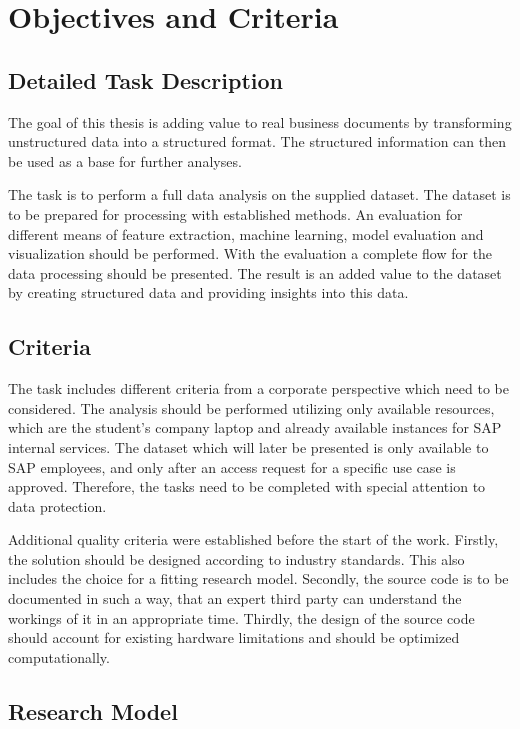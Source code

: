 \chapter{Objectives and Criteria}
\section{Detailed Task Description}
\label{section:detailed-task}
The goal of this thesis is adding value to real business documents by transforming unstructured data into a structured format. The structured information can then be used as a base for further analyses. 

The task is to perform a full data analysis on the supplied dataset. The dataset is to be prepared for processing with established methods. An evaluation for different means of feature extraction, machine learning, model evaluation and visualization should be performed. With the evaluation a complete flow for the data processing should be presented. The result is an added value to the dataset by creating structured data and providing insights into this data.

\section{Criteria}
\label{section:criteria}
The task includes different criteria from a corporate perspective which need to be considered. The analysis should be performed utilizing only available resources, which are the student’s company laptop and already available instances for SAP internal services. The dataset which will later be presented is only available to SAP employees, and only after an access request for a specific use case is approved. Therefore, the tasks need to be completed with special attention to data protection. 

Additional quality criteria were established before the start of the work. Firstly, the solution should be designed according to industry standards. This also includes the choice for a fitting research model. Secondly, the source code is to be documented in such a way, that an expert third party can understand the workings of it in an appropriate time. Thirdly, the design of the source code should account for existing hardware limitations and should be optimized computationally.

\label{research-model}
\section{Research Model}

